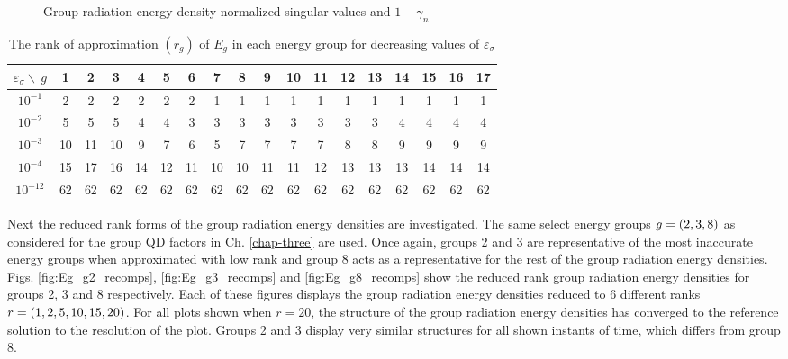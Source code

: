 	\begin{figure}[ht!]
		\centering
		 \hspace*{.5cm}
		\caption{\label{fig:Eg_sval_summary}
			Group radiation energy density normalized singular values and $1-\gamma_n$}
	\end{figure}
	
	\begin{table}[ht!]
		\caption{	\label{tab:gqd_sigtab} The rank of approximation $(r_g)$ of $E_g$ in each energy group for decreasing values of $\varepsilon_\sigma$}
		\begin{tabular}{|c||c|c|c|c|c|c|c|c|c|c|c|c|c|c|c|c|c|}	
			\hline
			$\varepsilon_\sigma \backslash  \ g$ & 1 & 2 & 3 & 4 & 5 & 6 & 7 & 8 & 9 & 10 & 11 & 12 & 13 & 14 & 15 & 16 & 17 \\
			\hline
			\hline
			$10^{-1}$ & 2  &  2 & 2  & 2  & 2  & 2  &  1 & 1 &  1 &   1 & 1 &  1 &  1 & 1 &  1 &  1 & 1 \\ \hline
			$10^{-2}$ & 5 & 5 & 5 & 4 & 4 & 3 & 3 & 3 & 3 & 3 & 3 & 3 & 3 & 4 & 4 & 4 & 4\\ \hline
			$10^{-3}$ & 10 & 11 & 10 & 9 & 7 & 6 & 5 & 7 & 7 & 7 & 7 & 8 & 8 & 9 & 9 & 9 & 9\\ \hline
			$10^{-4}$ & 15 & 17 & 16 & 14 & 12 & 11 & 10 & 10 & 11 & 11 & 12 & 13 & 13 & 13 & 14 & 14 & 14\\ \hline
			$10^{-12}$ & 62 & 62 & 62 & 62 & 62 & 62 & 62 & 62 & 62 & 62 & 62 & 62 & 62 & 62 & 62 & 62 & 62\\ \hline
		\end{tabular}
	\end{table}

	\ind Next the reduced rank forms of the group radiation energy densities are investigated. The same select energy groups $g=\left(2,3,8\right)$ as considered for the group QD factors in Ch. \ref{chap-three} are used. Once again, groups 2 and 3 are representative of the most inaccurate energy groups when approximated with low rank and group 8 acts as a representative for the rest of the group radiation energy densities. Figs. \ref{fig:Eg_g2_recomps}, \ref{fig:Eg_g3_recomps} and \ref{fig:Eg_g8_recomps} show the reduced rank group radiation energy densities for groups 2, 3 and 8 respectively. Each of these figures displays the group radiation energy densities reduced to 6 different ranks $r=\left(1,2,5,10,15,20\right)$. For all plots shown when $r=20$, the structure of the group radiation energy densities has converged to the reference solution to the resolution of the plot. Groups 2 and 3 display very similar structures for all shown instants of time, which differs from group 8. 
	
